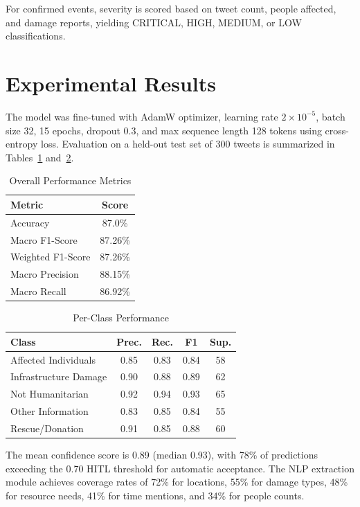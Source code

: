 \documentclass[pdflatex,sn-mathphys-num]{sn-jnl}
\theoremstyle{thmstyleone}%
\theoremstyle{thmstyletwo}%
\theoremstyle{thmstylethree}%
\begin{document}
For confirmed events, severity is scored based on tweet count, people affected, and damage reports, yielding CRITICAL, HIGH, MEDIUM, or LOW classifications.

\section{Experimental Results}

The model was fine-tuned with AdamW optimizer, learning rate $2 \times 10^{-5}$, batch size 32, 15 epochs, dropout 0.3, and max sequence length 128 tokens using cross-entropy loss. Evaluation on a held-out test set of 300 tweets is summarized in Tables~\ref{tab:overall_metrics} and~\ref{tab:class_metrics}.

\begin{table}[h]
\centering
\caption{Overall Performance Metrics}
\label{tab:overall_metrics}
\begin{tabular}{|l|c|}
\hline
\textbf{Metric} & \textbf{Score} \\
\hline
Accuracy & 87.0\% \\
Macro F1-Score & 87.26\% \\
Weighted F1-Score & 87.26\% \\
Macro Precision & 88.15\% \\
Macro Recall & 86.92\% \\
\hline
\end{tabular}
\end{table}

\begin{table}[h]
\centering
\caption{Per-Class Performance}
\label{tab:class_metrics}
\begin{tabular}{|l|c|c|c|c|}
\hline
\textbf{Class} & \textbf{Prec.} & \textbf{Rec.} & \textbf{F1} & \textbf{Sup.} \\
\hline
Affected Individuals & 0.85 & 0.83 & 0.84 & 58 \\
Infrastructure Damage & 0.90 & 0.88 & 0.89 & 62 \\
Not Humanitarian & 0.92 & 0.94 & 0.93 & 65 \\
Other Information & 0.83 & 0.85 & 0.84 & 55 \\
Rescue/Donation & 0.91 & 0.85 & 0.88 & 60 \\
\hline
\end{tabular}
\end{table}

The mean confidence score is 0.89 (median 0.93), with 78\% of predictions exceeding the 0.70 HITL threshold for automatic acceptance. The NLP extraction module achieves coverage rates of 72\% for locations, 55\% for damage types, 48\% for resource needs, 41\% for time mentions, and 34\% for people counts.
\end{document}
